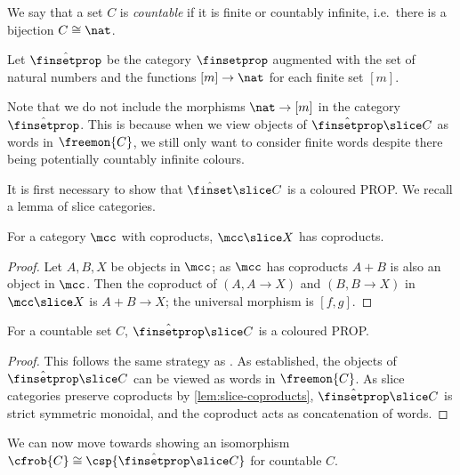 \begin{notation}
    We say that a set \(C\) is \emph{countable} if it is finite or countably
    infinite, i.e.\ there is a bijection \(C \cong \nat\).
\end{notation}

\begin{definition}
    Let \(\hat{\finsetprop}\) be the category \(\finsetprop\) augmented with the
    set of natural numbers and the functions \([m] \to \nat\) for each finite
    set \([m]\).
\end{definition}

Note that we do not include the morphisms \(\nat \to [m]\) in the category
\(\hat{\finsetprop}\).
This is because when we view objects of \(\hat{\finsetprop} \slice C\) as words
in \(\freemon{C}\), we still only want to consider finite words despite there
being potentially countably infinite colours.

It is first necessary to show that \(\hat{\finset} \slice C\) is a coloured
PROP.
We recall a lemma of slice categories.

\begin{lemma}
    \label{lem:slice-coproducts}
    For a category \(\mcc\) with coproducts, \(\mcc \slice X\) has coproducts.
\end{lemma}
\begin{proof}
    Let \(A,B,X\) be objects in \(\mcc\); as \(\mcc\) has coproducts \(A + B\)
    is also an object in \(\mcc\).
    Then the coproduct of \((A, A \to X)\) and \((B, B \to X)\) in
    \(\mcc \slice X\) is \(A + B \to X\); the universal morphism is \([f, g]\).
\end{proof}

\begin{proposition}
    \label{prop:hatfinsetprop-slice-is-coloured-prop}
    For a countable set \(C\), \(\hat{\finsetprop} \slice C\) is a
    coloured PROP.
\end{proposition}
\begin{proof}
    This follows the same strategy as \cite[Prop. 2.23]{bonchi2022string}.
    As established, the objects of \(\hat{\finsetprop} \slice C\) can be viewed
    as words in \(\freemon{C}\).
    As slice categories preserve coproducts by \cref{lem:slice-coproducts},
    \(\hat{\finsetprop} \slice C\) is strict symmetric monoidal, and the
    coproduct acts as concatenation of words.
\end{proof}

We can now move towards showing an isomorphism \(
    \cfrob{C} \cong \csp{\hat{\finsetprop} \slice C}
\) for countable \(C\).

